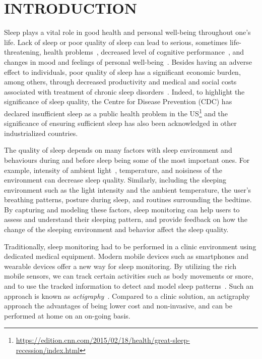 \section{INTRODUCTION}\label{sec:1introduction}

Sleep plays a vital role in good health and personal well-being throughout one's life. Lack of sleep or poor quality of sleep can lead to
serious, sometimes life-threatening, health problems~\cite{altena2008sleep,chandola2010effect,lallukka2016contribution}, decreased level of 
cognitive performance~\cite{alhola07sleep,akerstedt07altered}, and changes in mood and feelings of personal well-being~\cite{paunio09longitudinal,pilcher97sleep}. 
Besides having an adverse effect to individuals, poor quality of sleep has a significant economic burden, among others, through decreased productivity and medical and social costs 
associated with treatment of chronic sleep disorders~\cite{hafner17why}. Indeed, to highlight the significance of sleep quality, the Centre for Disease Prevention (CDC) has declared insufficient sleep 
as a public health problem in the US\footnote{\url{https://edition.cnn.com/2015/02/18/health/great-sleep-recession/index.html}} and the significance of ensuring sufficient sleep has also been 
acknowledged in other industrialized countries. 

The quality of sleep depends on many factors with sleep environment and behaviours during and before sleep being some of the most important ones. For example, intensity of ambient light~\cite{hood04determinants}, temperature, and noisiness of the environment can decrease sleep quality. Similarly, including the sleeping environment such as the light intensity and the ambient temperature, the user's
breathing patterns, posture during sleep, and routines surrounding the bedtime. By capturing and modeling these factors, sleep monitoring can help users to assess
and understand their sleeping pattern, and provide feedback on how the change of the sleeping environment and behavior affect the sleep
quality.

Traditionally, sleep monitoring had to be performed in a clinic environment using dedicated medical equipment.  Modern mobile devices such
as smartphones and wearable devices offer a new way for sleep monitoring. By utilizing the rich mobile sensors, we can track certain
activities such as body movements or snore, and to use the tracked information to detect and model sleep
patterns~\cite{zeo,Jawbone,SleepAndroid,fitbit,gu2016sleep}. Such an approach is known as
\emph{actigraphy}~\cite{Actigraphy,ancoli2003role}. Compared to a clinic solution, an actigraphy approach the advantages of being lower
cost and non-invasive, and can be performed at home on an on-going basis.

